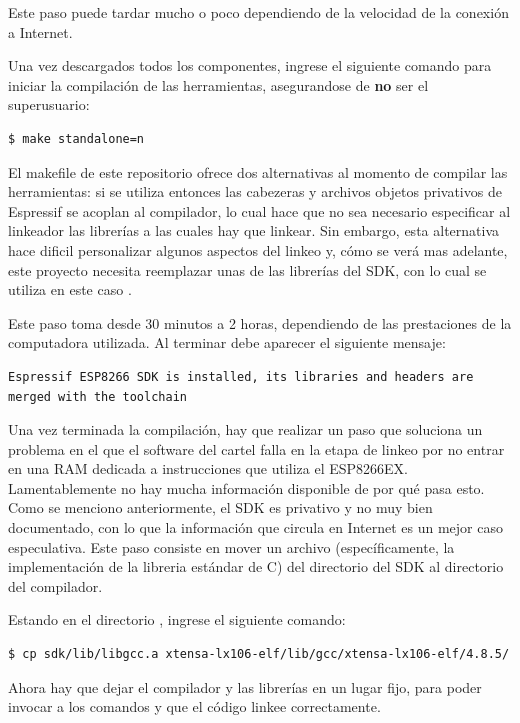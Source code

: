 Este paso puede tardar mucho o poco dependiendo de la velocidad de la conexión a Internet.

Una vez descargados todos los componentes, ingrese el siguiente comando para iniciar la compilación de las herramientas, asegurandose de {\bfseries no} ser el superusuario:

\begin{lstlisting}
$ make standalone=n
\end{lstlisting}

El makefile de este repositorio ofrece dos alternativas al momento de compilar las herramientas: si se utiliza  entonces las cabezeras y archivos objetos privativos de Espressif se acoplan al compilador, lo cual hace que no sea necesario especificar al linkeador las librerías a las cuales hay que linkear. Sin embargo, esta alternativa hace dificil personalizar algunos aspectos del linkeo y, cómo se verá mas adelante, este proyecto necesita reemplazar unas de las librerías del SDK, con lo cual se utiliza en este caso .

Este paso toma desde 30 minutos a 2 horas, dependiendo de las prestaciones de la computadora utilizada. Al terminar debe aparecer el siguiente mensaje:

\begin{lstlisting}
Espressif ESP8266 SDK is installed, its libraries and headers are merged with the toolchain
\end{lstlisting}


Una vez terminada la compilación, hay que realizar un paso que soluciona un problema en el que el software del cartel falla en la etapa de linkeo por no entrar en una RAM dedicada a instrucciones que utiliza el ESP8266EX. Lamentablemente no hay mucha información disponible de por qué pasa esto. Como se menciono anteriormente, el SDK es privativo y no muy bien documentado, con lo que la información que circula en Internet es un mejor caso especulativa. Este paso consiste en mover un archivo (específicamente, la implementación de la libreria estándar de C) del directorio del SDK al directorio del compilador.

Estando en el directorio , ingrese el siguiente comando:
\begin{lstlisting}
$ cp sdk/lib/libgcc.a xtensa-lx106-elf/lib/gcc/xtensa-lx106-elf/4.8.5/
\end{lstlisting}

Ahora hay que dejar el compilador y las librerías en un lugar fijo, para poder invocar a los comandos y que el código linkee correctamente.

